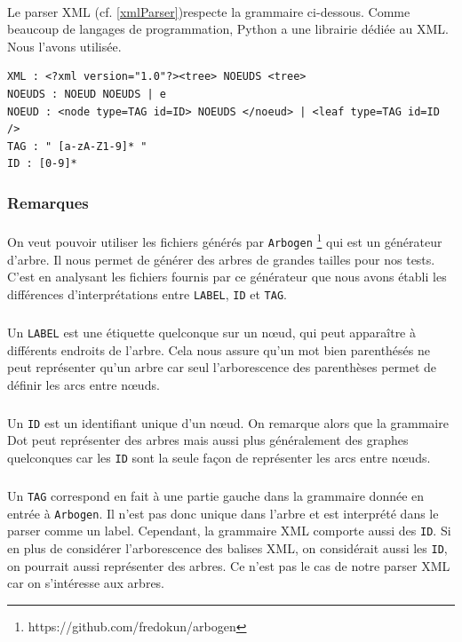 \paragraph{}Le parser XML (cf. \ref{xmlParser})respecte la grammaire ci-dessous. Comme beaucoup de langages de programmation, Python a une librairie dédiée au XML. Nous l'avons utilisée.
		
\begin{verbatim}
XML : <?xml version="1.0"?><tree> NOEUDS <tree>
NOEUDS : NOEUD NOEUDS | e
NOEUD : <node type=TAG id=ID> NOEUDS </noeud> | <leaf type=TAG id=ID />
TAG : " [a-zA-Z1-9]* "
ID : [0-9]*
\end{verbatim}

		\subsubsection*{Remarques}

\paragraph{} On veut pouvoir utiliser les fichiers générés par \verb|Arbogen| \footnote{https://github.com/fredokun/arbogen} qui est un générateur d'arbre. Il nous permet de générer des arbres de grandes tailles pour nos tests. C'est en analysant les fichiers fournis par ce générateur que nous avons établi les différences d'interprétations entre \verb|LABEL|, \verb|ID| et \verb|TAG|.

\subparagraph{}Un \verb|LABEL| est une étiquette quelconque sur un n\oe ud, qui peut apparaître à différents endroits de l'arbre. Cela nous assure qu'un mot bien parenthésés ne peut représenter qu'un arbre car seul l'arborescence des parenthèses permet de définir les arcs entre n\oe uds.

\subparagraph{}Un \verb|ID| est un identifiant unique d'un n\oe ud. On remarque alors que la grammaire Dot peut représenter des arbres mais aussi plus généralement des graphes quelconques car les \verb|ID| sont la seule façon de représenter les arcs entre n\oe uds.

\subparagraph{}Un \verb|TAG| correspond en fait à une partie gauche dans la grammaire donnée en entrée à \verb|Arbogen|. Il n'est pas donc unique dans l'arbre et est interprété dans le parser comme un label. Cependant, la grammaire XML comporte aussi des \verb|ID|. Si en plus de considérer l'arborescence des balises XML, on considérait aussi les \verb|ID|, on pourrait aussi représenter des arbres. Ce n'est pas le cas de notre parser XML car on s'intéresse aux arbres.


